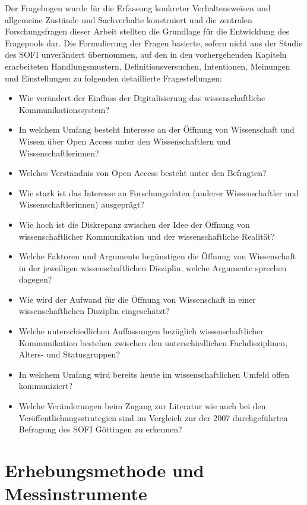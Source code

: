 Der Fragebogen wurde für die Erfassung konkreter Verhaltensweisen und allgemeine Zustände und Sachverhalte \cite{raab_2012_fragebogen} konstruiert und die zentralen Forschungsfragen dieser Arbeit stellten die Grundlage für die Entwicklung des Fragepools dar. Die Formulierung der Fragen basierte, sofern nicht aus der Studie des SOFI unverändert übernommen, auf den in den vorhergehenden Kapiteln erarbeiteten Handlungsmustern, Definitionsversuchen, Intentionen, Meinungen und Einstellungen zu folgenden detaillierte Fragestellungen:
\begin{itemize}
\item Wie verändert der Einfluss der Digitalisierung das wissenschaftliche Kommunikationssystem?
\item In welchem Umfang besteht Interesse an der Öffnung von Wissenschaft und Wissen über Open Access unter den Wissenschaftlern und Wissenschaftlerinnen?
\item Welches Verständnis von Open Access besteht unter den Befragten?
\item Wie stark ist das Interesse an Forschungsdaten (anderer Wissenschaftler und Wissenschaftlerinnen) ausgeprägt?
\item Wie hoch ist die Diskrepanz zwischen der Idee der Öffnung von wissenschaftlicher Kommunikation und der wissenschaftliche Realität?
\item Welche Faktoren und Argumente begünstigen die Öffnung von Wissenschaft in der jeweiligen wissenschaftlichen Disziplin, welche Argumente sprechen dagegen?
\item Wie wird der Aufwand für die Öffnung von Wissenschaft in einer wissenschaftlichen Disziplin eingeschätzt?
\item Welche unterschiedlichen Auffassungen bezüglich wissenschaftlicher Kommunikation bestehen zwischen den unterschiedlichen Fachdisziplinen, Alters- und Statusgruppen?
\item In welchem Umfang wird bereits heute im wissenschaftlichen Umfeld offen kommuniziert?
\item Welche Veränderungen beim Zugang zur Literatur wie auch bei den Veröffentlichungsstrategien sind im Vergleich zur der 2007 durchgeführten Befragung des SOFI Göttingen zu erkennen?
\end{itemize}

\section{Erhebungsmethode und Messinstrumente}


